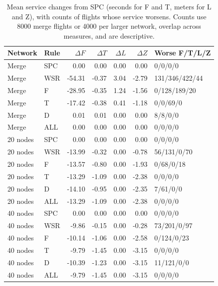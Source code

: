 \begin{table}[!htbp]
\caption{Mean service changes from SPC (seconds for F and T, meters for L and Z), with counts of flights whose service worsens. Counts use 8000 merge flights or 4000 per larger network, overlap across measures, and are descriptive.}\label{tab:service-split-services}
\centering\small
\begin{tabularx}{\textwidth}{l l r r r r L}
\toprule Network & Rule & $\Delta F$ & $\Delta T$ & $\Delta L$ & $\Delta Z$ & Worse F/T/L/Z\\\midrule
Merge & SPC & 0.00 & 0.00 & 0.00 & 0.00 & 0/0/0/0\\
Merge & WSR & -54.31 & -0.37 & 3.04 & -2.79 & 131/346/422/44\\
Merge & F & -28.95 & -0.35 & 1.24 & -1.56 & 0/128/189/20\\
Merge & T & -17.42 & -0.38 & 0.41 & -1.18 & 0/0/69/0\\
Merge & D & 0.01 & 0.01 & 0.00 & 0.00 & 8/8/0/0\\
Merge & ALL & 0.00 & 0.00 & 0.00 & 0.00 & 0/0/0/0\\
20 nodes & SPC & 0.00 & 0.00 & 0.00 & 0.00 & 0/0/0/0\\
20 nodes & WSR & -13.99 & -0.32 & 0.00 & -0.78 & 56/131/0/70\\
20 nodes & F & -13.57 & -0.80 & 0.00 & -1.93 & 0/68/0/18\\
20 nodes & T & -13.29 & -1.09 & 0.00 & -2.38 & 0/0/0/0\\
20 nodes & D & -14.10 & -0.95 & 0.00 & -2.35 & 7/61/0/0\\
20 nodes & ALL & -13.29 & -1.09 & 0.00 & -2.38 & 0/0/0/0\\
40 nodes & SPC & 0.00 & 0.00 & 0.00 & 0.00 & 0/0/0/0\\
40 nodes & WSR & -9.86 & -0.15 & 0.00 & -0.28 & 73/201/0/97\\
40 nodes & F & -10.14 & -1.06 & 0.00 & -2.58 & 0/124/0/23\\
40 nodes & T & -9.79 & -1.45 & 0.00 & -3.15 & 0/0/0/0\\
40 nodes & D & -10.39 & -1.23 & 0.00 & -3.15 & 11/121/0/0\\
40 nodes & ALL & -9.79 & -1.45 & 0.00 & -3.15 & 0/0/0/0\\
\bottomrule
\end{tabularx}
\end{table}
